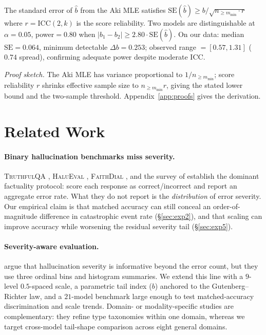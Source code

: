 \documentclass{article}
\newcommand{\sdi}{\ensuremath{b}}
\begin{document}
\begin{proposition}\label{prop:resolution}
The standard error of $\hat{b}$ from the Aki MLE satisfies
$\mathrm{SE}(\hat{b}) \geq b / \sqrt{n_{\geq m_{\min}} \cdot r}$
where $r = \mathrm{ICC}(2,k)$ is the score reliability.
Two models are distinguishable at $\alpha{=}0.05$, power${=}0.80$
when $|b_1 - b_2| \geq 2.80 \cdot \mathrm{SE}(\hat{b})$.
On our data: median $\mathrm{SE} = 0.064$, minimum detectable
$\Delta b = 0.253$; observed range $= [0.57, 1.31]$ ($0.74$ spread),
confirming adequate power despite moderate ICC.
\end{proposition}

\emph{Proof sketch.} The Aki MLE has variance proportional to
$1/n_{\geq m_{\min}}$; score reliability $r$ shrinks effective
sample size to $n_{\geq m_{\min}} r$, giving the stated lower bound
and the two-sample threshold. Appendix~\ref{app:proofs} gives the
derivation.

\section{Related Work}\label{sec:related}

\paragraph{Binary hallucination benchmarks miss severity.}
\textsc{TruthfulQA} \citep{lin2022truthfulqa}, \textsc{HaluEval}
\citep{liu2023halueval}, \textsc{FaithDial}
\citep{dziri2024faithdial}, and the survey of
\citet{ji2023survey} establish the dominant factuality protocol:
score each response as correct/incorrect and report an aggregate
error rate. What they do not report is the \emph{distribution} of
error severity. Our empirical claim is that matched accuracy can
still conceal an order-of-magnitude difference in catastrophic
event rate (\S\ref{sec:exp2}), and that scaling can improve
accuracy while worsening the residual severity tail
(\S\ref{sec:exp5}).

\paragraph{Severity-aware evaluation.} \citet{asgari2025severity}
argue that hallucination severity is informative beyond the error
count, but they use three ordinal bins and histogram summaries. We
extend this line with a $9$-level $0.5$-spaced scale, a parametric
tail index (\sdi{}) anchored to the Gutenberg--Richter law, and a
$21$-model benchmark large enough to test matched-accuracy
discrimination and scale trends. Domain- or modality-specific
studies
\citep{dahl2024hallucination,colelough2025cliniqlink,
chang2025medheval,zuo2024medhallbench,pandit2025medhallu,
seth2024hallucinogen,atwany2025her,halueval2024v2} are
complementary: they refine type taxonomies within one domain,
whereas we target cross-model tail-shape comparison across eight
general domains.
\end{document}
